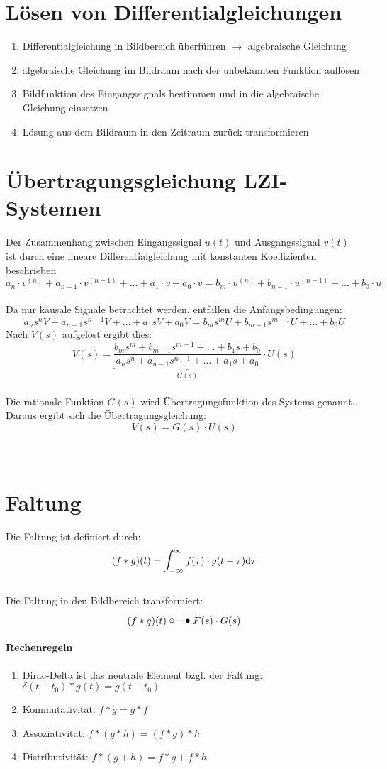 \section{Lösen von Differentialgleichungen}
\begin{enumerate}
	\item Differentialgleichung in Bildbereich überführen $\rightarrow$ algebraische Gleichung
	\item algebraische Gleichung im Bildraum nach der unbekannten Funktion auflösen
	\item Bildfunktion des Eingangssignals bestimmen und in die algebraische Gleichung einsetzen
	\item Lösung aus dem Bildraum in den Zeitraum zurück transformieren
\end{enumerate}

\section{Übertragungsgleichung LZI-Systemen}
Der Zusammenhang zwischen Eingangssignal $u(t)$ und Ausgangssignal $v(t)$ ist durch eine lineare Differentialgleichung mit konstanten Koeffizienten beschrieben
\[
	a_n\cdot v^{(n)} + a_{n-1} \cdot v^{(n-1)} + \ldots + a_1 \cdot \dot{v} +a_0\cdot v = b_m\cdot u^{(n)} + b_{n-1} \cdot u^{(n-1)} + \ldots + b_0 \cdot u 
\]
\\
Da nur kausale Signale betrachtet werden, entfallen die Anfangsbedingungen:
\[
	a_ns^nV+a_{n-1}s^{n-1}V+\ldots+a_1sV+a_0V=b_ms^mU+b_{m-1}s^{m-1}U+\ldots+b_0U
\]
Nach $V(s)$ aufgelöst ergibt dies:
\[
	V(s)=\underbrace{\frac{b_ms^m + b_{m-1}s^{m-1}+\ldots+b_1s + b_0}{a_ns^n + a_{n-1}s^{n-1}+\ldots+a_1s + a_0}}_{G(s)} \cdot U(s)
\]
\\
Die rationale Funktion $G(s)$ wird Übertragungsfunktion des Systems genannt. Daraus ergibt sich die Übertragungsgleichung:
\[
	V(s) = G(s) \cdot U(s)
\]
\\\\

\section{Faltung}
Die Faltung ist definiert durch:
\[
	(f \ast g)(t) = \int_{-\infty}^{\infty}f(\tau) \cdot g(t-\tau) \mathrm{d} \tau
\]
\\
Die Faltung in den Bildbereich transformiert:
\[
	(f \ast g)(t) \ \laplace \ F(s) \cdot G(s)
\]

\paragraph{Rechenregeln}
\begin{enumerate}
	\item Dirac-Delta ist das neutrale Element bzgl. der Faltung: $\delta(t-t_0) \ast g(t) = g(t-t_0)$
	\item Kommutativität: $f\ast g = g \ast f$
	\item Assoziativität: $f \ast (g \ast h) = (f \ast g) \ast h$
	\item Distributivität: $f \ast (g + h) = f \ast g + f \ast h$
\end{enumerate}

